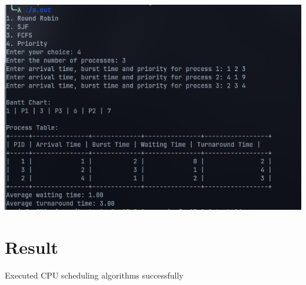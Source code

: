 \newpage
\includegraphics[]{Cycle_2//Outputs/priorityscheule.png}

\section{Result}
Executed CPU scheduling algorithms successfully